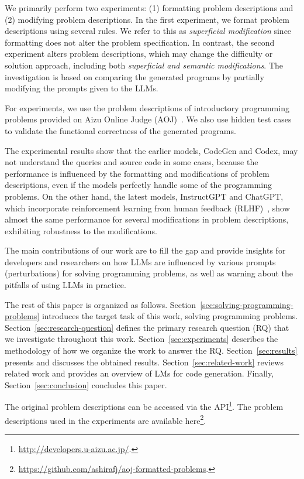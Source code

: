 \documentclass{article}
\begin{document}
We primarily perform two experiments: (1) formatting problem descriptions and (2) modifying problem descriptions. 
In the first experiment, we format problem descriptions using several rules.
We refer to this as \textit{superficial modification} since formatting does not alter the problem specification.
In contrast, the second experiment alters problem descriptions, which may change the difficulty or solution approach, including both \textit{superficial and semantic modifications}.
The investigation is based on comparing the generated programs by partially modifying the prompts given to the LLMs.

For experiments, we use the problem descriptions of introductory programming problems provided on Aizu Online Judge (AOJ)~\citep{watanobe2004aoj, watanobe2022aoj}.
We also use hidden test cases to validate the functional correctness of the generated programs.

The experimental results show that the earlier models, CodeGen and Codex, may not understand the queries and source code in some cases, because the performance is influenced by the formatting and modifications of problem descriptions, even if the models perfectly handle some of the programming problems.
On the other hand, the latest models, InstructGPT and ChatGPT, which incorporate reinforcement learning from human feedback (RLHF)~\citep{ouyang2022instructgpt}, show almost the same performance for several modifications in problem descriptions, exhibiting robustness to the modifications.

The main contributions of our work are to fill the gap and provide insights for developers and researchers on how LLMs are influenced by various prompts (perturbations) for solving programming problems, as well as warning about the pitfalls of using LLMs in practice.

The rest of this paper is organized as follows.
Section~\ref{sec:solving-programming-problems} introduces the target task of this work, solving programming problems.
Section~\ref{sec:research-question} defines the primary research question (RQ) that we investigate throughout this work.
Section~\ref{sec:experiments} describes the methodology of how we organize the work to answer the RQ.
Section~\ref{sec:results} presents and discusses the obtained results.
Section~\ref{sec:related-work} reviews related work and provides an overview of LMs for code generation.
Finally, Section~\ref{sec:conclusion} concludes this paper.

The original problem descriptions can be accessed via the API\footnote{\url{http://developers.u-aizu.ac.jp/}.}.
The problem descriptions used in the experiments are available here\footnote{\url{https://github.com/ashirafj/aoj-formatted-problems}.}.
\end{document}
